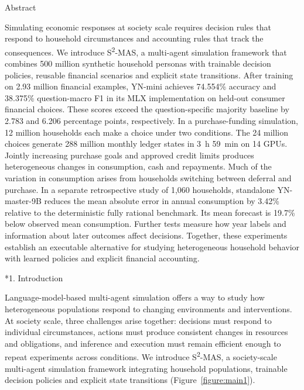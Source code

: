 \documentclass[10pt]{article}
\makeatletter
\renewcommand\section{\@startsection{section}{1}{\z@}{-2.2ex plus -1ex minus -.2ex}{.9ex plus .2ex}{\normalfont\large\mdseries}}
\makeatother
\begin{document}
\vspace{3pt}
\begin{center}{\normalsize Abstract}\end{center}
\begingroup
\setlength{\parindent}{0pt}
\setlength{\parskip}{0pt}
\begin{minipage}{\textwidth}\small
Simulating economic responses at society scale requires decision rules that respond to household circumstances and accounting rules that track the consequences. We introduce S\textsuperscript{2}-MAS, a multi-agent simulation framework that combines 500 million synthetic household personas with trainable decision policies, reusable financial scenarios and explicit state transitions. After training on 2.93 million financial examples, YN-mini achieves 74.554\% accuracy and 38.375\% question-macro F1 in its MLX implementation on held-out consumer financial choices. These scores exceed the question-specific majority baseline by 2.783 and 6.206 percentage points, respectively. In a purchase-funding simulation, 12 million households each make a choice under two conditions. The 24 million choices generate 288 million monthly ledger states in 3~h 59~min on 14 GPUs. Jointly increasing purchase goals and approved credit limits produces heterogeneous changes in consumption, cash and repayments. Much of the variation in consumption arises from households switching between deferral and purchase. In a separate retrospective study of 1,060 households, standalone YN-master-9B reduces the mean absolute error in annual consumption by 3.42\% relative to the deterministic fully rational benchmark. Its mean forecast is 19.7\% below observed mean consumption. Further tests measure how year labels and information about later outcomes affect decisions. Together, these experiments establish an executable alternative for studying heterogeneous household behavior with learned policies and explicit financial accounting.
\end{minipage}
\endgroup
\par\vspace{10pt}

\section*{1. Introduction}

Language-model-based multi-agent simulation offers a way to study how heterogeneous populations respond to changing environments and interventions. At society scale, three challenges arise together: decisions must respond to individual circumstances, actions must produce consistent changes in resources and obligations, and inference and execution must remain efficient enough to repeat experiments across conditions. We introduce S\textsuperscript{2}-MAS, a society-scale multi-agent simulation framework integrating household populations, trainable decision policies and explicit state transitions (Figure~\ref{figure:main1}).
\end{document}
